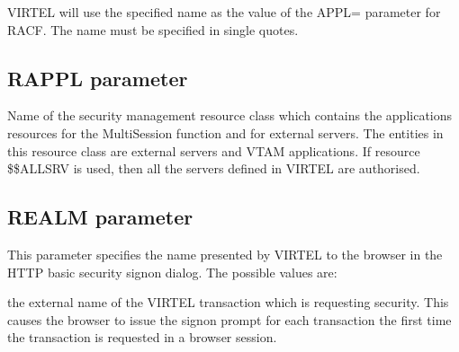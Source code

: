 \documentclass[letterpaper,10pt,english]{sphinxmanual}
\begin{document}
\sphinxAtStartPar
{} \sphinxhyphen{} VIRTEL will use the specified name as the value of the APPL= parameter for RACF. The name must be specified in single quotes.

\ignorespaces 

\subsection{RAPPL parameter}
\label{\detokenize{Installation_Guide:rappl-parameter}}\label{\detokenize{Installation_Guide:index-106}}
\begin{sphinxVerbatim}[commandchars=\\\{\}]
 
\end{sphinxVerbatim}

\sphinxAtStartPar
{} \sphinxhyphen{} Name of the security management resource class which contains the applications resources for the Multi\sphinxhyphen{}Session function and for external servers. The entities in this resource class are external servers and VTAM applications. If resource \$\$ALLSRV is used, then all the servers defined in VIRTEL are authorised.

\ignorespaces 

\subsection{REALM parameter}
\label{\detokenize{Installation_Guide:realm-parameter}}\label{\detokenize{Installation_Guide:index-107}}
\begin{sphinxVerbatim}[commandchars=\\\{\}]
 
\end{sphinxVerbatim}

\sphinxAtStartPar
This parameter specifies the name presented by VIRTEL to the browser in the HTTP basic security signon dialog. The possible values are:

\sphinxAtStartPar
{} \sphinxhyphen{} the external name of the VIRTEL transaction which is requesting security. This causes the browser to issue the signon prompt for each transaction the first time the transaction is requested in a browser session.
\end{document}
